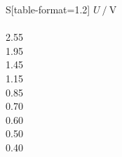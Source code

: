 


\begin{table}
    \centering
    \caption{Messdaten zur Zeitabhängigkeit der Amplitude.}
    \label{tab:Mess1}
    \begin{tabular}{S[table-format=1.2]}
        \toprule
        $U \mathbin{/} \unit{\volt}$ \\
         \\
        2.55 \\
        1.95 \\
        1.45 \\
        1.15 \\
        0.85 \\
        0.70 \\
        0.60 \\
        0.50 \\
        0.40 \\
    \bottomrule 
    \end{tabular}
\end{table}

